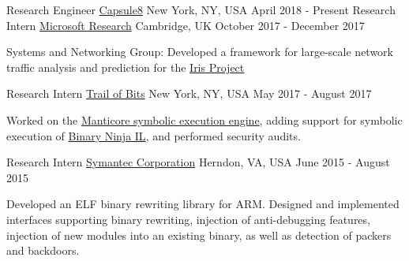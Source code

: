 

\begin{cventries}

  \cventry
    {Research Engineer}
		{\href{https://capsule8.com/}{Capsule8}} %
    {New York, NY, USA}
    {April 2018 - Present}
    {
    }
\vspace{0.1in}
  \cventry
    {Research Intern}
		{\href{https://www.microsoft.com/en-us/research/lab/microsoft-research-cambridge/}{Microsoft Research}} %
    {Cambridge, UK}
    {October 2017 - December 2017}
    {
      \begin{cvitems} %
      \item {Systems and Networking Group: Developed a framework for
          large-scale network traffic analysis and prediction for the
              \href{https://www.microsoft.com/en-us/research/project/iris}{Iris Project}}
      \end{cvitems}
    }

\vspace{0.1in}

\cventry
    {Research Intern} %
		{\href{May 2017 - August 2017}{Trail of Bits}} %
    {New York, NY, USA}
    {May 2017 - August 2017}
    {
      \begin{cvitems} %
      \item {Worked on the \href{https://github.com/trailofbits/manticore}{Manticore symbolic execution engine}, adding support
          for symbolic execution of \href{https://binary.ninja/}{Binary Ninja IL}, and performed security audits.}
      \end{cvitems}
    }

\vspace{0.1in}

  \cventry
    {Research Intern} %
		{\href{May 2015 - August 2015}{Symantec Corporation}} %
    {Herndon, VA, USA}
    {June 2015 - August 2015}
    {
      \begin{cvitems} %
        \item {Developed an ELF binary rewriting library for ARM. Designed and
            implemented interfaces supporting binary rewriting, injection of
              anti-debugging features, injection of new modules into an existing
              binary, as well as detection of packers and backdoors.}
      \end{cvitems}
    }



\end{cventries}
